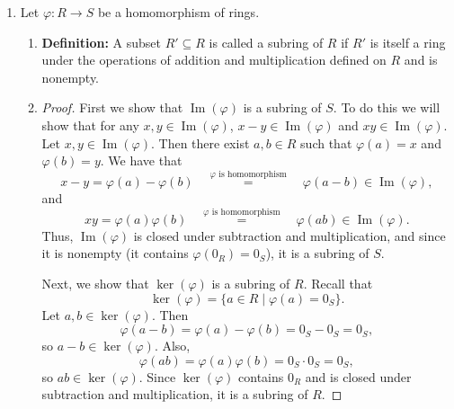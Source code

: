 \documentclass{article}
\begin{document}
\begin{enumerate}
\newpage
    \item Let $\varphi : R \to S$ be a homomorphism of rings.
    \begin{enumerate}
        \item %
        \textbf{Definition: }A subset $R' \subseteq R$ is called a subring of $R$ if $R'$ is itself a ring under the operations of addition and multiplication defined on $R$ and is nonempty. \\
        \item %
        \begin{proof}
            First we show that $\operatorname{Im}(\varphi)$ is a subring of $S$. To do this we will show that for any $x, y \in \operatorname{Im}(\varphi)$,
            $x - y \in \operatorname{Im}(\varphi)$ and $xy \in \operatorname{Im}(\varphi)$. \\ 
            Let $x, y \in \operatorname{Im}(\varphi)$. Then there exist $a, b \in R$ such that $\varphi(a) = x$ and $\varphi(b) = y$. We have that 
            \[
                x - y = \varphi(a) - \varphi(b)\quad  \stackrel{\varphi \text{ is homomorphism}}{=} \quad \varphi(a - b) \in \operatorname{Im}(\varphi),
            \]
            and
            \[
                xy = \varphi(a) \varphi(b) \quad \stackrel{\varphi \text{ is homomorphism}}{=} \quad \varphi(ab) \in \operatorname{Im}(\varphi).
            \]
            Thus, $\operatorname{Im}(\varphi)$ is closed under subtraction and multiplication, and since it is nonempty (it contains $\varphi(0_R) = 0_S$), it is a subring of $S$.

            Next, we show that $\ker(\varphi)$ is a subring of $R$. Recall that
            \[
                \ker(\varphi) = \{a \in R \mid \varphi(a) = 0_S\}.
            \]
            Let $a, b \in \ker(\varphi)$. Then
            \[
                \varphi(a - b) = \varphi(a) - \varphi(b) = 0_S - 0_S = 0_S,
            \]
            so $a - b \in \ker(\varphi)$. Also,
            \[
                \varphi(ab) = \varphi(a) \varphi(b) = 0_S \cdot 0_S = 0_S,
            \]
            so $ab \in \ker(\varphi)$. Since $\ker(\varphi)$ contains $0_R$ and is closed under subtraction and multiplication, it is a subring of $R$.
        \end{proof}
    \end{enumerate}

\end{enumerate}
\end{document}
